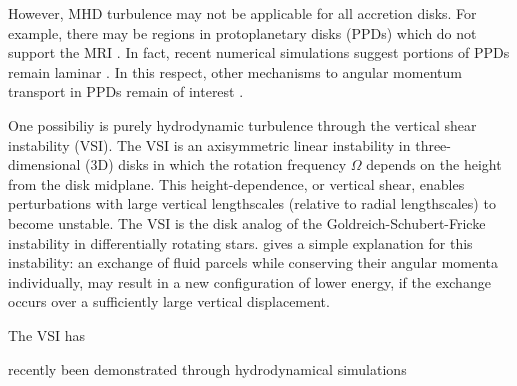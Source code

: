 \documentclass[iop]{emulateapj}
\begin{document}
However, MHD turbulence may not be applicable for all  
accretion disks. For example, there may be regions in protoplanetary  
disks (PPDs) which do not support the MRI 
\citep{gammie96,landry13}. In fact, recent  numerical simulations
suggest portions of PPDs remain laminar \citep[e.g.][and references
therein]{lesur14,bai15,gressel15}. In this respect, other mechanisms 
to angular momentum transport in PPDs remain of interest
\citep{armitage10}. 
 
One possibiliy is purely hydrodynamic turbulence through the vertical
shear instability (VSI). The VSI is an axisymmetric linear instability
in three-dimensional (3D) disks in which the rotation frequency
$\Omega$ depends on the height from the disk midplane. This
height-dependence, or vertical shear, enables perturbations with
large vertical lengthscales (relative to radial lengthscales) to
become unstable. The VSI is the disk analog of the
Goldreich-Schubert-Fricke instability
\citep[GSF,]{goldreich67,fricke68} in differentially rotating stars.   
\cite{umurhan13} gives a simple explanation for this 
instability: an exchange of fluid parcels while conserving their
angular momenta individually, may result in a new configuration of
lower energy, if the exchange occurs over a sufficiently large
vertical displacement.  

The VSI has 








recently been demonstrated through 
hydrodynamical simulations \citep{nelson13} 


















 


\appendix




\end{document}
